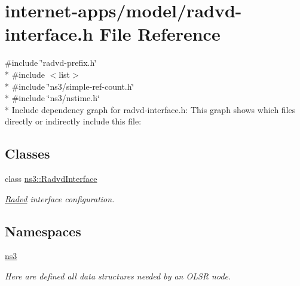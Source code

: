 \hypertarget{radvd-interface_8h}{}\section{internet-\/apps/model/radvd-\/interface.h File Reference}
\label{radvd-interface_8h}
{\ttfamily \#include \char`\"{}radvd-\/prefix.\+h\char`\"{}}\\*
{\ttfamily \#include $<$list$>$}\\*
{\ttfamily \#include \char`\"{}ns3/simple-\/ref-\/count.\+h\char`\"{}}\\*
{\ttfamily \#include \char`\"{}ns3/nstime.\+h\char`\"{}}\\*
Include dependency graph for radvd-\/interface.h\+:
This graph shows which files directly or indirectly include this file\+:
\subsection*{Classes}
\begin{DoxyCompactItemize}
\item 
class \hyperlink{classns3_1_1RadvdInterface}{ns3\+::\+Radvd\+Interface}
\begin{DoxyCompactList}\small\item\em \hyperlink{classns3_1_1Radvd}{Radvd} interface configuration. \end{DoxyCompactList}\end{DoxyCompactItemize}
\subsection*{Namespaces}
\begin{DoxyCompactItemize}
\item 
 \hyperlink{namespacens3}{ns3}
\begin{DoxyCompactList}\small\item\em Here are defined all data structures needed by an O\+L\+SR node. \end{DoxyCompactList}\end{DoxyCompactItemize}
